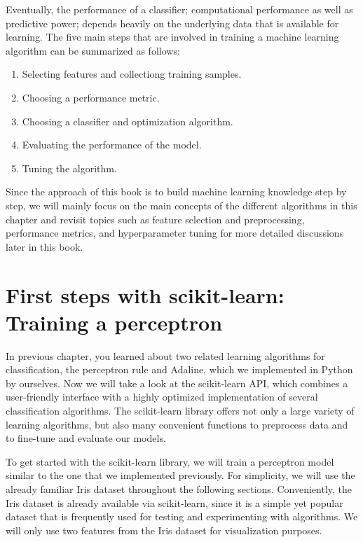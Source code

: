 \documentclass[11pt]{article}
\providecommand{\tightlist}{%
      \setlength{\itemsep}{0pt}\setlength{\parskip}{0pt}}
\begin{document}
    Eventually, the performance of a classifier; computational performance
as well as predictive power; depends heavily on the underlying data that
is available for learning. The five main steps that are involved in
training a machine learning algorithm can be summarized as follows:

\begin{enumerate}
\def\labelenumi{\arabic{enumi}.}
\tightlist
\item
  Selecting features and collectiong training samples.
\item
  Choosing a performance metric.
\item
  Choosing a classifier and optimization algorithm.
\item
  Evaluating the performance of the model.
\item
  Tuning the algorithm.
\end{enumerate}

Since the approach of this book is to build machine learning knowledge
step by step, we will mainly focus on the main concepts of the different
algorithms in this chapter and revisit topics such as feature selection
and preprocessing, performance metrics, and hyperparameter tuning for
more detailed discussions later in this book.

    \section{First steps with scikit-learn: Training a
perceptron}\label{first-steps-with-scikit-learn-training-a-perceptron}

    In previous chapter, you learned about two related learning algorithms
for classification, the perceptron rule and Adaline, which we
implemented in Python by ourselves. Now we will take a look at the
scikit-learn API, which combines a user-friendly interface with a highly
optimized implementation of several classification algorithms. The
scikit-learn library offers not only a large variety of learning
algorithms, but also many convenient functions to preprocess data and to
fine-tune and evaluate our models.

To get started with the scikit-learn library, we will train a perceptron
model similar to the one that we implemented previously. For simplicity,
we will use the already familiar Iris dataset throughout the following
sections. Conveniently, the Iris dataset is already available via
scikit-learn, since it is a simple yet popular dataset that is
frequently used for testing and experimenting with algorithms. We will
only use two features from the Iris dataset for visualization purposes.
\end{document}
